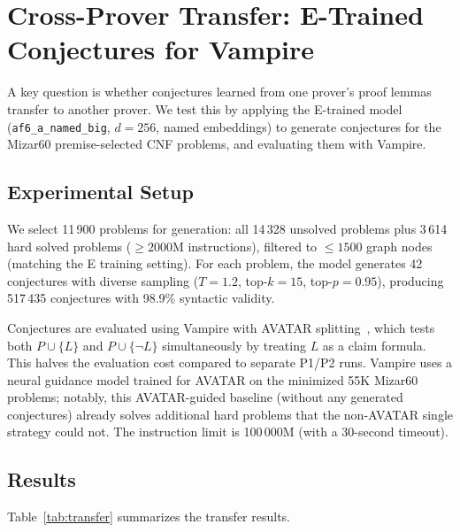 \documentclass{easychair}
\newcommand{\Eprover}{E\xspace}
\newcommand{\Vampire}{Vampire\xspace}
\begin{document}
\section{Cross-Prover Transfer: E-Trained Conjectures for Vampire}
\label{sec:transfer}

A key question is whether conjectures learned from one prover's
proof lemmas transfer to another prover.  We test this by applying
the \Eprover-trained model (\texttt{af6\_a\_named\_big}, $d=256$,
named embeddings) to generate conjectures for the Mizar60
premise-selected CNF problems, and evaluating them with \Vampire.

\subsection{Experimental Setup}

We select 11\,900 problems for generation: all 14\,328 unsolved
problems plus 3\,614 hard solved problems ($\geq 2000$M instructions),
filtered to $\leq 1500$ graph nodes (matching the \Eprover training
setting).  For each problem, the model generates 42 conjectures
with diverse sampling ($T{=}1.2$, top-$k{=}15$, top-$p{=}0.95$),
producing 517\,435 conjectures with 98.9\% syntactic validity.

Conjectures are evaluated using \Vampire with AVATAR
splitting~\cite{Kovacs2013}, which tests both $P \cup \{L\}$ and
$P \cup \{\neg L\}$ simultaneously by treating $L$ as a claim
formula.  This halves the evaluation cost compared to separate
P1/P2 runs.  \Vampire uses a neural guidance model trained for
AVATAR on the minimized 55K Mizar60 problems; notably, this
AVATAR-guided baseline (without any generated conjectures) already
solves additional hard problems that the non-AVATAR single strategy
could not.  The instruction limit is 100\,000M (with a 30-second
timeout).

\subsection{Results}

Table~\ref{tab:transfer} summarizes the transfer results.
\end{document}
